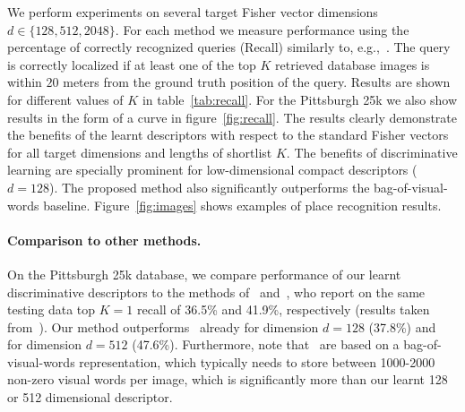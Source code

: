 \documentclass[10pt,twocolumn,letterpaper]{article}
\begin{document}
      We perform experiments on several target Fisher vector dimensions $d\in\{128,512,2048\}$. For each method we measure performance using the percentage of correctly recognized queries (Recall) similarly to, e.g.,~\cite{Chen11,Knopp2010,Sattler-BMVC12}. The query is correctly localized if at least one of the top $K$ retrieved database images is within $20$ meters from the ground truth position of the query. Results are shown for different values of $K$ in table~\ref{tab:recall}. For the Pittsburgh 25k we also show results in the form of a curve in figure~\ref{fig:recall}. The results clearly demonstrate the benefits of the learnt descriptors with respect to the standard Fisher vectors for all target dimensions and lengths of shortlist $K$. The benefits of discriminative learning are specially prominent for low-dimensional compact descriptors ($d=128$). 
      The proposed method also significantly outperforms the bag-of-visual-words baseline. Figure~\ref{fig:images} shows examples of place recognition results. 

      \paragraph{Comparison to other methods.}
         On the Pittsburgh 25k database, we compare performance of our learnt discriminative descriptors to the methods of~\cite{Gronat13} and~\cite{Knopp2010}, who report on the same testing data top $K=1$ recall of 36.5\% and 41.9\%, respectively (results taken from~\cite{Gronat13}). Our method outperforms~\cite{Knopp2010} already for dimension $d=128$ (37.8\%) and~\cite{Gronat13} for dimension $d=512$ (47.6\%). Furthermore, note that~\cite{Gronat13,Knopp2010} are based on a bag-of-visual-words representation, which typically needs to store between 1000-2000 non-zero visual words per image, which is significantly more than our learnt 128 or 512 dimensional descriptor. 
         
\end{document}

